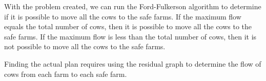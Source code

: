 \documentclass[a4paper,12pt]{article}
\begin{document}
With the problem created, we can run the Ford-Fulkerson algorithm to determine
if it is possible to move all the cows to the safe farms. If the maximum flow
equals the total number of cows, then it is possible to move all the cows to the
safe farms. If the maximum flow is less than the total number of cows, then it is
not possible to move all the cows to the safe farms.

Finding the actual plan requires using the residual graph to determine the flow
of cows from each farm to each safe farm.
\end{document}
